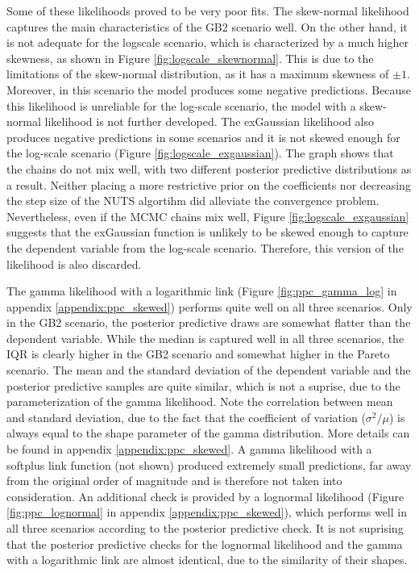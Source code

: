 Some of these likelihoods proved to be very poor fits.
The skew-normal likelihood captures the main characteristics of the GB2 scenario well.
On the other hand, it is not adequate for the logscale scenario, which is characterized by a much higher skewness, as shown in Figure \ref{fig:logscale_skewnormal}.
This is due to the limitations of the skew-normal distribution, as it has a maximum skewness of $\pm 1$.
Moreover, in this scenario the model produces some negative predictions.
Because this likelihood is unreliable for the log-scale scenario, the model with a skew-normal likelihood is not further developed.
The exGaussian likelihood also produces negative predictions in some scenarios and it is not skewed enough for the log-scale scenario (Figure \ref{fig:logscale_exgaussian}).
The graph shows that the chains do not mix well, with two different posterior predictive distributions as a result.
Neither placing a more restrictive prior on the coefficients nor decreasing the step size of the NUTS algortihm did alleviate the convergence problem.
Nevertheless, even if the MCMC chains mix well, Figure \ref{fig:logscale_exgaussian} suggests that the exGaussian function is unlikely to be skewed enough to capture the dependent variable from the log-scale scenario.
Therefore, this version of the likelihood is also discarded.

The gamma likelihood with a logarithmic link (Figure \ref{fig:ppc_gamma_log} in appendix \ref{appendix:ppc_skewed}) performs quite well on all three scenarios.
Only in the GB2 scenario, the posterior predictive draws are somewhat flatter than the dependent variable.
While the median is captured well in all three scenarios, the IQR is clearly higher in the GB2 scenario and somewhat higher in the Pareto scenario.
The mean and the standard deviation of the dependent variable and the posterior predictive samples are quite similar, which is not a suprise, due to the parameterization of the gamma likelihood.
Note the correlation between mean and standard deviation, due to the fact that the coefficient of variation ($\sigma^2/\mu $) is always equal to the shape parameter of the gamma distribution.
More details can be found in appendix \ref{appendix:ppc_skewed}.
A gamma likelihood with a softplus link function (not shown) produced extremely small predictions, far away from the original order of magnitude and is therefore not taken into consideration.
An additional check is provided by a lognormal likelihood (Figure \ref{fig:ppc_lognormal} in appendix \ref{appendix:ppc_skewed}), which performs well in all three scenarios according to the posterior predictive check.
It is not suprising that the posterior predictive checks for the lognormal likelihood and the gamma with a logarithmic link are almost identical, due to the similarity of their shapes.


